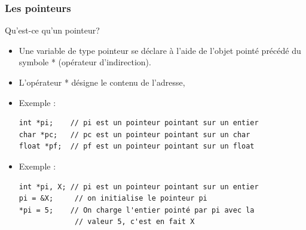 \documentclass{beamer}
\begin{document}
  
\begin{frame}[fragile]
\frametitle{Les pointeurs}

\begin{block}{Qu'est-ce qu'un pointeur?}
\begin{itemize}
\item Une variable de type pointeur se déclare à l'aide de l'objet pointé précédé du symbole * (opérateur d'indirection).
\item L'opérateur  *  désigne le contenu de l'adresse,
\end{itemize}
\end{block}

\begin{itemize}
\item Exemple :
\begin{verbatim}
int *pi;   	// pi est un pointeur pointant sur un entier  
char *pc;	// pc est un pointeur pointant sur un char
float *pf;	// pf est un pointeur pointant sur un float
\end{verbatim}
\item Exemple :
\begin{verbatim}
int *pi, X; // pi est un pointeur pointant sur un entier
pi = &X;	 // on initialise le pointeur pi  
*pi = 5;    // On charge l'entier pointé par pi avec la 				
             // valeur 5, c'est en fait X
\end{verbatim}
\end{itemize}

\end{frame}
  
\end{document}
